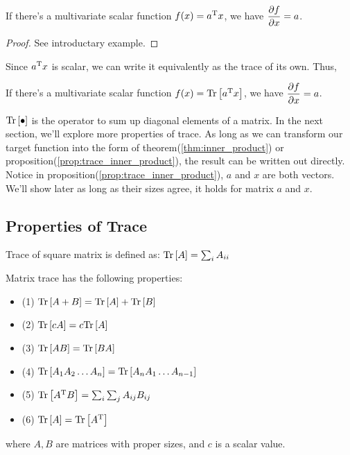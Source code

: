 \begin{mythm}
	\label{thm:inner_product}
	If there's a multivariate scalar function $f(x) = a^\mathrm{T}x$, 
	we have $\dfrac{\partial f}{\partial x} = a$.
\end{mythm}

\begin{proof}
See introductary example. 
\end{proof}

Since $a^\mathrm{T}x$ is scalar, we can write it equivalently as the 
trace of its own. Thus, 
\begin{myprop}
	\label{prop:trace_inner_product}
	If there's a multivariate scalar function $f(x) = \mathrm{Tr}\left[a^\mathrm{T}x\right]$, 
	we have $\dfrac{\partial f}{\partial x} = a$.
\end{myprop}

$\mathrm{Tr}\left[\bullet\right]$ is the operator to sum up diagonal elements of a matrix. 
In the next section, we'll explore more properties of trace. 
As long as we can transform our target function into the form of 
theorem(\ref{thm:inner_product}) or proposition(\ref{prop:trace_inner_product}), 
the result can be written out directly. Notice in 
proposition(\ref{prop:trace_inner_product}), $a$ and $x$ are both vectors. 
We'll show later as long as their sizes agree, it holds for matrix $a$ and $x$. 

\subsection{Properties of Trace}

\begin{mydef}
Trace of square matrix is defined as: $\mathrm{Tr}\left[A\right] = \sum_{i}{A_{ii}}$
\end{mydef}

\begin{mythm}
\label{thm:trace_prop}
Matrix trace has the following properties:
\begin{itemize}
	\item (1) $\mathrm{Tr}\left[A+B\right] = \mathrm{Tr}\left[A\right] + \mathrm{Tr}\left[B\right]$
	\item (2) $\mathrm{Tr}\left[cA\right] = c \mathrm{Tr}\left[A\right]$
	\item (3) $\mathrm{Tr}\left[AB\right] = \mathrm{Tr}\left[BA\right]$
	\item (4) $\mathrm{Tr}\left[A_1A_2 \ldots A_n\right]=\mathrm{Tr}\left[A_nA_1 \ldots A_{n-1}\right]$
	\item (5) $\mathrm{Tr}\left[A^\mathrm{T}B\right] = \sum_{i}\sum_{j}{A_{ij}B_{ij}}$
	\item (6) $\mathrm{Tr}\left[A\right] = \mathrm{Tr}\left[A^\mathrm{T}\right]$
\end{itemize}
where $A,B$ are matrices with proper sizes, and $c$ is a scalar value. 
\end{mythm}

